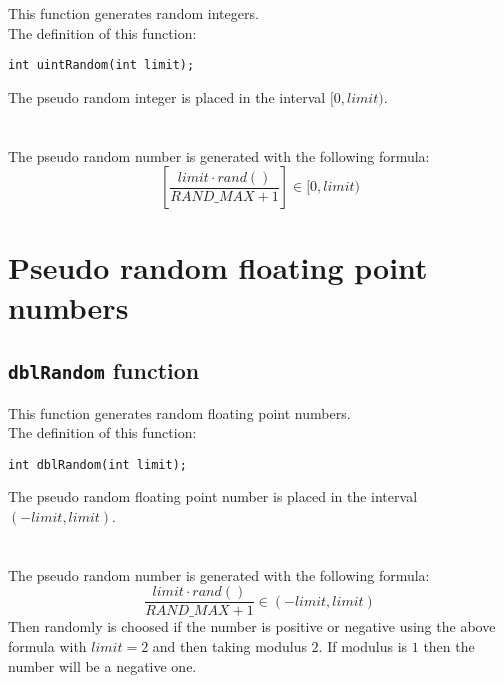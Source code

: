 This function generates random integers.\\

The definition of this function:
%
\begin{verbatim}
int uintRandom(int limit);  
\end{verbatim}
%
The pseudo random integer is placed in the interval $[0,limit)$.\\ \\
%
%
\ \\
%
The pseudo random number is generated with the following formula:
%
\begin{displaymath}
\left[ \frac{limit \cdot rand()}{RAND\_MAX + 1} \right] \in [0,limit)
\end{displaymath}
%

\section{Pseudo random floating point numbers}

\subsection{\texttt{dblRandom} function} \label{sec:dblRandom}

This function generates random floating point numbers.\\

The definition of this function:
%
\begin{verbatim}
int dblRandom(int limit);  
\end{verbatim}
%
The pseudo random floating point number is placed in the interval $(-limit,limit)$.\\ \\
%
%
\ \\
%
The pseudo random number is generated with the following formula:
%
\begin{displaymath}
\frac{limit \cdot rand()}{RAND\_MAX + 1} \in (-limit,limit)
\end{displaymath}
%
Then randomly is choosed if the number is positive or negative using the above formula with $limit=2$ and then taking modulus $2$. If modulus is $1$ then the number will be a negative one.

